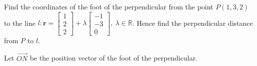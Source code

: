 \documentclass[11pt,a4paper]{book}
\newcommand{\R}{\mathbb{R}}
\begin{document}
\begin{example}

Find the coordinates of the foot of the perpendicular from the point
$P\left(1,3,2\right)$ to the line $l:\textbf{r}=\begin{bmatrix}1\\
2\\
2
\end{bmatrix}+\lambda\begin{bmatrix}-1\\
-3\\
0
\end{bmatrix},\:\lambda\in\R$. Hence find the perpendicular distance from $P$ to $l$.

\Solution

Let $\overrightarrow{ON}$ be the position vector of the foot of the
perpendicular.


\end{example}
\end{document}
